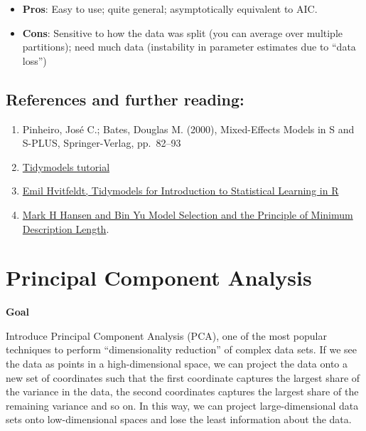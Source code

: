 \documentclass[
  letterpaper,
  DIV=11,
  numbers=noendperiod]{scrreprt}
\providecommand{\tightlist}{%
  \setlength{\itemsep}{0pt}\setlength{\parskip}{0pt}}\usepackage{longtable,booktabs,array}
\begin{document}
\begin{itemize}
\tightlist
\item
  \textbf{Pros}: Easy to use; quite general; asymptotically equivalent
  to AIC.
\item
  \textbf{Cons}: Sensitive to how the data was split (you can average
  over multiple partitions); need much data (instability in parameter
  estimates due to ``data loss'')
\end{itemize}

\section{References and further
reading:}\label{references-and-further-reading}

\begin{enumerate}
\def\labelenumi{\arabic{enumi}.}
\item
  Pinheiro, José C.; Bates, Douglas M. (2000), Mixed-Effects Models in S
  and S-PLUS, Springer-Verlag, pp.~82--93
\item
  \href{https://www.tidymodels.org/start/}{Tidymodels tutorial}
\item
  \href{https://emilhvitfeldt.github.io/ISLR-tidymodels-labs/index.html}{Emil
  Hvitfeldt, Tidymodels for Introduction to Statistical Learning in R}
\item
  \href{https://www.tandfonline.com/doi/abs/10.1198/016214501753168398}{Mark
  H Hansen and Bin Yu Model Selection and the Principle of Minimum
  Description Length}.
\end{enumerate}


\chapter{Principal Component
Analysis}\label{principal-component-analysis}

\textbf{Goal}

Introduce Principal Component Analysis (PCA), one of the most popular
techniques to perform ``dimensionality reduction'' of complex data sets.
If we see the data as points in a high-dimensional space, we can project
the data onto a new set of coordinates such that the first coordinate
captures the largest share of the variance in the data, the second
coordinates captures the largest share of the remaining variance and so
on. In this way, we can project large-dimensional data sets onto
low-dimensional spaces and lose the least information about the data.
\end{document}
